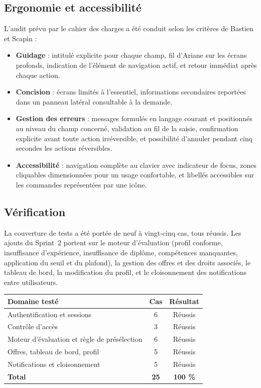 \documentclass[11pt,a4paper]{article}
\begin{document}
\subsection{Ergonomie et accessibilité}
L'audit prévu par le cahier des charges a été conduit selon les critères de Bastien et Scapin :
\begin{itemize}[leftmargin=1.5em, nosep]
  \item \textbf{Guidage} : intitulé explicite pour chaque champ, fil d'Ariane sur les écrans profonds, indication de l'élément de navigation actif, et retour immédiat après chaque action.
  \item \textbf{Concision} : écrans limités à l'essentiel, informations secondaires reportées dans un panneau latéral consultable à la demande.
  \item \textbf{Gestion des erreurs} : messages formulés en langage courant et positionnés au niveau du champ concerné, validation au fil de la saisie, confirmation explicite avant toute action irréversible, et possibilité d'annuler pendant cinq secondes les actions réversibles.
  \item \textbf{Accessibilité} : navigation complète au clavier avec indicateur de focus, zones cliquables dimensionnées pour un usage confortable, et libellés accessibles sur les commandes représentées par une icône.
\end{itemize}

\subsection{Vérification}
La couverture de tests a été portée de neuf à vingt-cinq cas, tous réussis. Les ajouts du Sprint~2 portent sur le moteur d'évaluation (profil conforme, insuffisance d'expérience, insuffisance de diplôme, compétences manquantes, application du seuil et du plafond), la gestion des offres et des droits associés, le tableau de bord, la modification du profil, et le cloisonnement des notifications entre utilisateurs.

\begin{center}
\begin{tabular}{lcc}
  \toprule
  \textbf{Domaine testé} & \textbf{Cas} & \textbf{Résultat} \\
  \midrule
  Authentification et sessions & 6 & \textcolor{vert}{Réussis} \\
  Contrôle d'accès & 3 & \textcolor{vert}{Réussis} \\
  Moteur d'évaluation et règle de présélection & 6 & \textcolor{vert}{Réussis} \\
  Offres, tableau de bord, profil & 5 & \textcolor{vert}{Réussis} \\
  Notifications et cloisonnement & 5 & \textcolor{vert}{Réussis} \\
  \midrule
  \textbf{Total} & \textbf{25} & \textcolor{vert}{\textbf{100 \%}} \\
  \bottomrule
\end{tabular}
\end{center}
\end{document}
